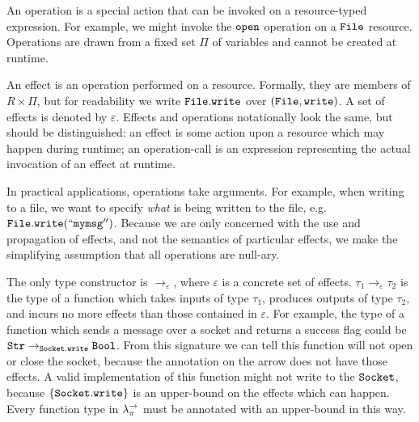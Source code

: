 An operation is a special action that can be invoked on a resource-typed expression. For example, we might invoke the $\mathtt{open}$ operation on a $\mathtt{File}$ resource. Operations are drawn from a fixed set $\Pi$ of variables and cannot be created at runtime.

An effect is an operation performed on a resource. Formally, they are members of $R \times \Pi$, but for readability we write $\mathtt{File.write}$ over $\mathtt{(File, write)}$. A set of effects is denoted by $\varepsilon$. Effects and operations notationally look the same, but should be distinguished: an effect is some action upon a resource which may happen during runtime; an operation-call is an expression representing the actual invocation of an effect at runtime.

In practical applications, operations take arguments. For example, when writing to a file, we want to specify \textit{what} is being written to the file, e.g. $\mathtt{File.write(``my msg'')}$. Because we are only concerned with the use and propagation of effects, and not the semantics of particular effects, we make the simplifying assumption that all operations are null-ary.

The only type constructor is $\rightarrow_{\varepsilon}$, where $\varepsilon$ is a concrete set of effects. $\tau_1 \rightarrow_{\varepsilon} \tau_2$ is the type of a function which takes inputs of type $\tau_1$, produces outputs of type $\tau_2$, and incurs no more effects than those contained in $\varepsilon$. For example, the type of a function which sends a message over a socket and returns a success flag could be $\mathtt{Str} \rightarrow_{\mathtt{Socket.write}} \mathtt{Bool}$. From this signature we can tell this function will not open or close the socket, because the annotation on the arrow does not have those effects. A valid implementation of this function might not write to the $\mathtt{Socket}$, because $\{ \mathtt{Socket.write} \}$ is an upper-bound on the effects which can happen. Every function type in $\lambda^{\rightarrow}_{\pi}$ must be annotated with an upper-bound in this way.



